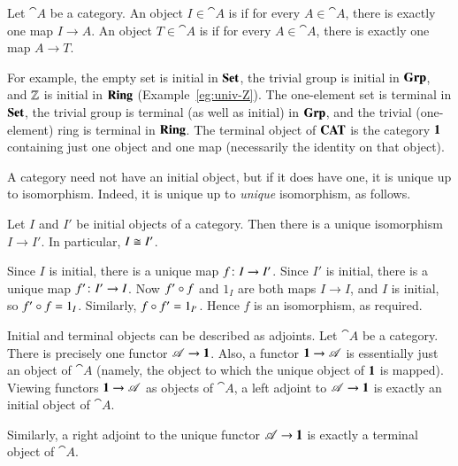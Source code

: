 \begin{defn}    
\label{defn:init-term}
Let $\cat{A}$ be a category.  An object $I \in \cat{A}$ is %
%
%
if for every $A \in \cat{A}$, there is exactly one map $I \to A$.  An
object $T \in \cat{A}$ is %
%
%
if for every $A \in \cat{A}$, there is exactly one map $A \to T$.
\end{defn}

For example, the empty set is initial in $\mathbf{Set}$, the trivial group is
initial in $\mathbf{Grp}$, and $\mathbb{Z}$%
%
%
is initial in $\mathbf{Ring}$ (Example~\ref{eg:univ-Z}).  The one-element set is
terminal in $\mathbf{Set}$, the trivial group is terminal (as well as initial) in
$\mathbf{Grp}$, and the trivial (one-element) ring is terminal in $\mathbf{Ring}$.  The
terminal object of $\mathbf{CAT}$ is the category $\mathbf{1}$ containing just one object
and one map (necessarily the identity on that object).

A category need not have an initial object, but if it does have one, it is
unique%
%
%
up to isomorphism.  Indeed, it is unique up to \emph{unique} isomorphism,
as follows.

\begin{lemma}   
\label{lemma:init-unique}
Let $I$ and $I'$ be initial objects of a category.  Then there is a unique
isomorphism $I \to I'$.  In particular, $I \cong I'$.
\end{lemma}

\begin{pf}
Since $I$ is initial, there is a unique map $f\from I \to I'$.  Since $I'$
is initial, there is a unique map $f'\from I' \to I$.  Now $f' \mathbin{\circ} f$ and
$1_I$ are both maps $I \to I$, and $I$ is initial, so $f' \mathbin{\circ} f = 1_I$.
Similarly, $f \mathbin{\circ} f' = 1_{I'}$.  Hence $f$ is an isomorphism, as required.
\end{pf}

\begin{example}
\label{eg:init-term}
%
%
Initial and terminal objects can be described as adjoints.  Let $\cat{A}$
be a category.  There is precisely one functor $\mathscr{A} \to \mathbf{1}$.  Also, a
functor $\mathbf{1} \to \mathscr{A}$ is essentially just an object of $\cat{A}$
(namely, the object to which the unique object of $\mathbf{1}$ is mapped).
Viewing functors $\mathbf{1} \to \mathscr{A}$ as objects of $\cat{A}$, a left adjoint
to $\mathscr{A} \to \mathbf{1}$ is exactly an initial object of $\cat{A}$.

Similarly, a right adjoint to the unique functor $\mathscr{A} \to \mathbf{1}$ is
exactly a terminal object of $\cat{A}$.
\end{example}

